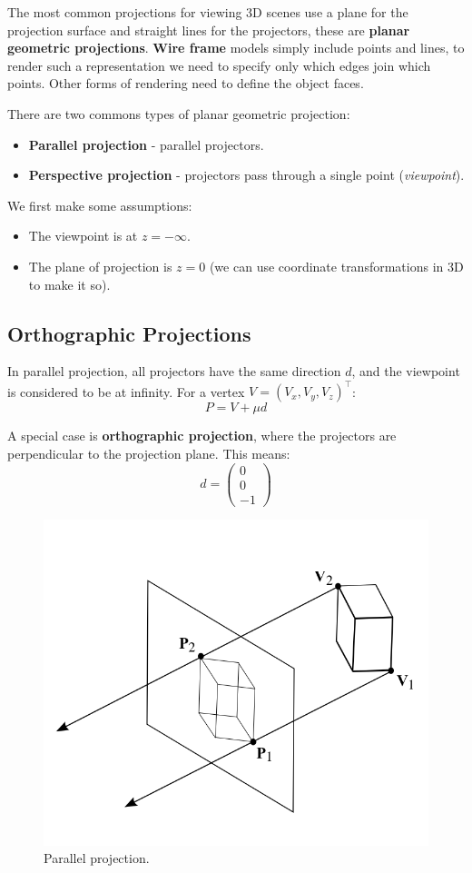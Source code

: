\documentclass[11pt]{article}
\begin{document}
The most common projections for viewing 3D scenes use a plane for the projection surface and straight lines for the projectors, these are \textbf{planar geometric projections}.
\textbf{Wire frame} models simply include points and lines, to render such a representation we need to specify only which edges join which points.
Other forms of rendering need to define the object faces.

There are two commons types of planar geometric projection:
\begin{itemize}
  \item \textbf{Parallel projection} - parallel projectors.
  \item \textbf{Perspective projection} - projectors pass through a single point (\textit{viewpoint}).
\end{itemize}

We first make some assumptions:
\begin{itemize}
  \item The viewpoint is at $z = - \infty$.
  \item The plane of projection is $z = 0$ (we can use coordinate transformations in 3D to make it so).
\end{itemize}

\subsection{Orthographic Projections}
In parallel projection, all projectors have the same direction $d$, and the viewpoint is considered to be at infinity.
For a vertex $V = (V_x, V_y, V_z)^\intercal$:
\[
  P = V + \mu d
\]

A special case is \textbf{orthographic projection}, where the projectors are perpendicular to the projection plane.
This means:
\[
  d = 
  \begin{pmatrix}
    0 \\
    0 \\
    -1
  \end{pmatrix}
\]

\begin{figure}[htb!]
  \caption{Parallel projection.}
  \includegraphics[scale=0.3]{parallel}
  \centering
\end{figure}
\end{document}
